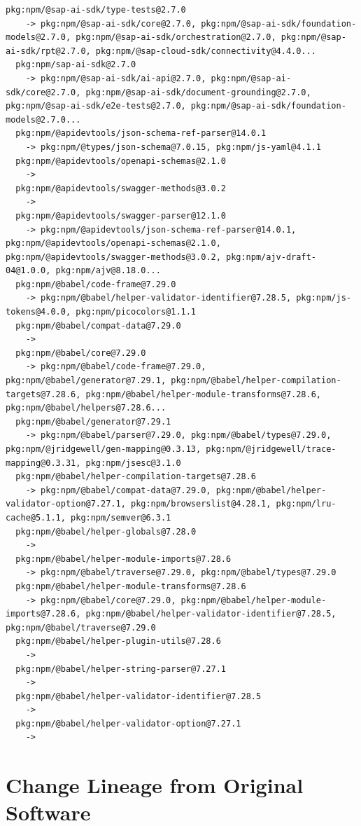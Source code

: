 \documentclass[11pt,a4paper]{article}
\begin{document}
\begin{lstlisting}[style=depgraph]
  pkg:npm/@sap-ai-sdk/type-tests@2.7.0
    -> pkg:npm/@sap-ai-sdk/core@2.7.0, pkg:npm/@sap-ai-sdk/foundation-models@2.7.0, pkg:npm/@sap-ai-sdk/orchestration@2.7.0, pkg:npm/@sap-ai-sdk/rpt@2.7.0, pkg:npm/@sap-cloud-sdk/connectivity@4.4.0...
  pkg:npm/sap-ai-sdk@2.7.0
    -> pkg:npm/@sap-ai-sdk/ai-api@2.7.0, pkg:npm/@sap-ai-sdk/core@2.7.0, pkg:npm/@sap-ai-sdk/document-grounding@2.7.0, pkg:npm/@sap-ai-sdk/e2e-tests@2.7.0, pkg:npm/@sap-ai-sdk/foundation-models@2.7.0...
  pkg:npm/@apidevtools/json-schema-ref-parser@14.0.1
    -> pkg:npm/@types/json-schema@7.0.15, pkg:npm/js-yaml@4.1.1
  pkg:npm/@apidevtools/openapi-schemas@2.1.0
    -> 
  pkg:npm/@apidevtools/swagger-methods@3.0.2
    -> 
  pkg:npm/@apidevtools/swagger-parser@12.1.0
    -> pkg:npm/@apidevtools/json-schema-ref-parser@14.0.1, pkg:npm/@apidevtools/openapi-schemas@2.1.0, pkg:npm/@apidevtools/swagger-methods@3.0.2, pkg:npm/ajv-draft-04@1.0.0, pkg:npm/ajv@8.18.0...
  pkg:npm/@babel/code-frame@7.29.0
    -> pkg:npm/@babel/helper-validator-identifier@7.28.5, pkg:npm/js-tokens@4.0.0, pkg:npm/picocolors@1.1.1
  pkg:npm/@babel/compat-data@7.29.0
    -> 
  pkg:npm/@babel/core@7.29.0
    -> pkg:npm/@babel/code-frame@7.29.0, pkg:npm/@babel/generator@7.29.1, pkg:npm/@babel/helper-compilation-targets@7.28.6, pkg:npm/@babel/helper-module-transforms@7.28.6, pkg:npm/@babel/helpers@7.28.6...
  pkg:npm/@babel/generator@7.29.1
    -> pkg:npm/@babel/parser@7.29.0, pkg:npm/@babel/types@7.29.0, pkg:npm/@jridgewell/gen-mapping@0.3.13, pkg:npm/@jridgewell/trace-mapping@0.3.31, pkg:npm/jsesc@3.1.0
  pkg:npm/@babel/helper-compilation-targets@7.28.6
    -> pkg:npm/@babel/compat-data@7.29.0, pkg:npm/@babel/helper-validator-option@7.27.1, pkg:npm/browserslist@4.28.1, pkg:npm/lru-cache@5.1.1, pkg:npm/semver@6.3.1
  pkg:npm/@babel/helper-globals@7.28.0
    -> 
  pkg:npm/@babel/helper-module-imports@7.28.6
    -> pkg:npm/@babel/traverse@7.29.0, pkg:npm/@babel/types@7.29.0
  pkg:npm/@babel/helper-module-transforms@7.28.6
    -> pkg:npm/@babel/core@7.29.0, pkg:npm/@babel/helper-module-imports@7.28.6, pkg:npm/@babel/helper-validator-identifier@7.28.5, pkg:npm/@babel/traverse@7.29.0
  pkg:npm/@babel/helper-plugin-utils@7.28.6
    -> 
  pkg:npm/@babel/helper-string-parser@7.27.1
    -> 
  pkg:npm/@babel/helper-validator-identifier@7.28.5
    -> 
  pkg:npm/@babel/helper-validator-option@7.27.1
    -> 
\end{lstlisting}

\newpage
\section{Change Lineage from Original Software}
\end{document}
